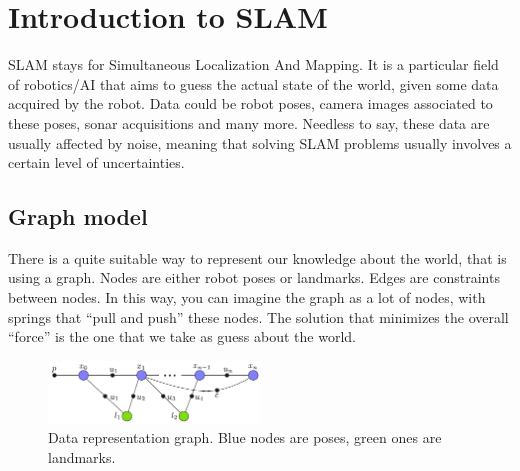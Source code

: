 \chapter{Introduction to SLAM}
SLAM stays for Simultaneous Localization And Mapping. It is a particular field of robotics/AI that aims to guess the actual state of the world, given some data acquired by the robot.
Data could be robot poses, camera images associated to these poses, sonar acquisitions and many more.
Needless to say, these data are usually affected by noise, meaning that solving SLAM problems usually involves a certain level of uncertainties.

\section{Graph model}
There is a quite suitable way to represent our knowledge about the world, that is using a graph.
Nodes are either robot poses or landmarks.
Edges are constraints between nodes.
In this way, you can imagine the graph as a lot of nodes, with springs that ``pull and push'' these nodes.
The solution that minimizes the overall ``force'' is the one that we take as guess about the world.

\begin{figure}[htbp]
  \centering
    \includegraphics[width=0.5\textwidth]{images/graph.png}
  \caption{Data representation graph. Blue nodes are poses, green ones are landmarks.}
\end{figure}

